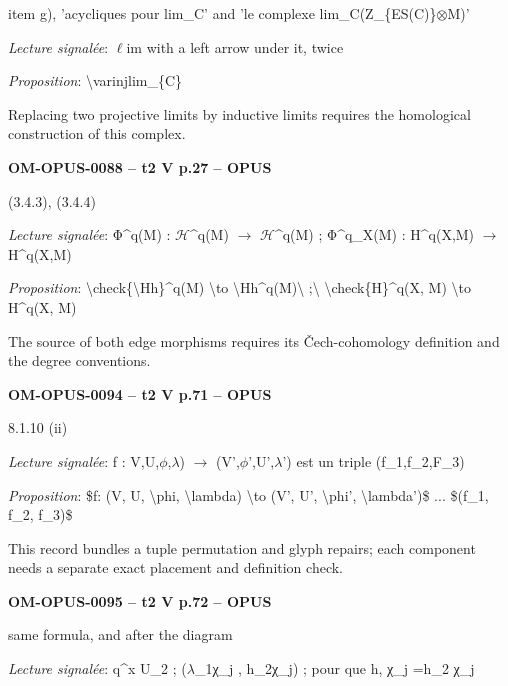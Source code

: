 item g), 'acycliques pour lim\_C' and 'le complexe lim\_C(Z\_\{ES(C)\}\ensuremath{\otimes}M)'\par
\emph{Lecture signalée}: \ensuremath{\ell}im with a left arrow under it, twice\par
\emph{Proposition}: \textbackslash{}varinjlim\_\{C\}\par
Replacing two projective limits by inductive limits requires the homological construction of this complex.\par
\par\noindent\textbf{OM-OPUS-0088 -- t2 V p.27 -- OPUS}\par
(3.4.3), (3.4.4)\par
\emph{Lecture signalée}: Φ\textasciicircum{}q(M) : \ensuremath{\mathcal{H}}\textasciicircum{}q(M) \ensuremath{\to} \ensuremath{\mathcal{H}}\textasciicircum{}q(M) ; Φ\textasciicircum{}q\_X(M) : H\textasciicircum{}q(X,M) \ensuremath{\to} H\textasciicircum{}q(X,M)\par
\emph{Proposition}: \textbackslash{}check\{\textbackslash{}Hh\}\textasciicircum{}q(M) \textbackslash{}to \textbackslash{}Hh\textasciicircum{}q(M)\textbackslash{} ;\textbackslash{} \textbackslash{}check\{H\}\textasciicircum{}q(X, M) \textbackslash{}to H\textasciicircum{}q(X, M)\par
The source of both edge morphisms requires its Čech-cohomology definition and the degree conventions.\par
\par\noindent\textbf{OM-OPUS-0094 -- t2 V p.71 -- OPUS}\par
8.1.10 (ii)\par
\emph{Lecture signalée}: f : V,U,\ensuremath{\phi},\ensuremath{\lambda}) \ensuremath{\longrightarrow} (V',\ensuremath{\phi}',U',\ensuremath{\lambda}') est un triple (f\_1,f\_2,F\_3)\par
\emph{Proposition}: \$f: (V, U, \textbackslash{}phi, \textbackslash{}lambda) \textbackslash{}to (V', U', \textbackslash{}phi', \textbackslash{}lambda')\$ ... \$(f\_1, f\_2, f\_3)\$\par
This record bundles a tuple permutation and glyph repairs; each component needs a separate exact placement and definition check.\par
\par\noindent\textbf{OM-OPUS-0095 -- t2 V p.72 -- OPUS}\par
same formula, and after the diagram\par
\emph{Lecture signalée}: q\textasciicircum{}x U\_2 ; (\ensuremath{\lambda}\_1χ\_j , h\_2χ\_j) ; pour que h, χ\_j =\allowbreak  h\_2 χ\_j\par
